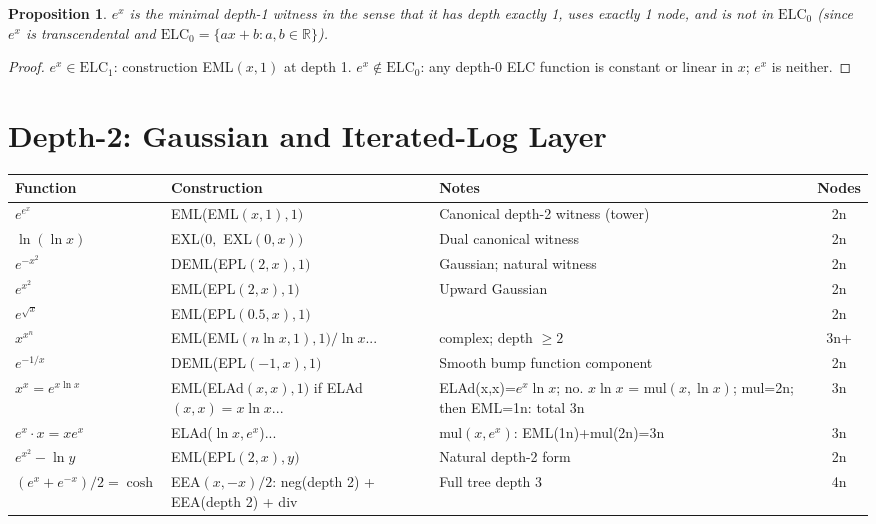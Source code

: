\documentclass[11pt]{article}
\newtheorem{proposition}[theorem]{Proposition}
\begin{document}
\begin{proposition}
$e^x$ is the minimal depth-1 witness in the sense that it has depth exactly 1,
uses exactly 1 node, and is not in $\mathrm{ELC}_0$ (since $e^x$ is transcendental
and $\mathrm{ELC}_0 = \{ax+b : a,b \in \mathbb{R}\}$).
\end{proposition}

\begin{proof}
$e^x \in \mathrm{ELC}_1$: construction EML$(x,1)$ at depth 1.
$e^x \notin \mathrm{ELC}_0$: any depth-0 ELC function is constant or linear in $x$;
$e^x$ is neither.
\end{proof}

\section{Depth-2: Gaussian and Iterated-Log Layer}
\label{sec:depth2}

\begin{center}
\begin{longtable}{lllc}
\toprule
Function & Construction & Notes & Nodes \\
\midrule
$e^{e^x}$ & EML(EML$(x,1),1)$ & Canonical depth-2 witness (tower) & 2n \\
$\ln(\ln x)$ & EXL$(0,$ EXL$(0,x))$ & Dual canonical witness & 2n \\
$e^{-x^2}$ & DEML(EPL$(2,x),1)$ & Gaussian; natural witness & 2n \\
$e^{x^2}$ & EML(EPL$(2,x),1)$ & Upward Gaussian & 2n \\
$e^{\sqrt{x}}$ & EML(EPL$(0.5,x),1)$ & & 2n \\
$x^{x^n}$ & EML(EML$(n\ln x,1), 1)/\ln x$... & complex; depth $\geq 2$ & 3n+ \\
$e^{-1/x}$ & DEML(EPL$(-1,x),1)$ & Smooth bump function component & 2n \\
$x^x = e^{x\ln x}$ & EML(ELAd$(x,x),1)$ if ELAd$(x,x) = x\ln x$... & ELAd(x,x)=$e^x \ln x$; no. $x\ln x$ = mul$(x,\ln x)$; mul=2n; then EML=1n: total 3n & 3n \\
$e^x \cdot x = xe^x$ & ELAd($\ln x, e^x$)... & mul$(x,e^x)$: EML(1n)+mul(2n)=3n & 3n \\
$e^{x^2} - \ln y$ & EML(EPL$(2,x),y)$ & Natural depth-2 form & 2n \\
$(e^x + e^{-x})/2 = \cosh$ & EEA$(x,-x)/2$: neg(depth 2) + EEA(depth 2) + div & Full tree depth 3 & 4n \\
\bottomrule
\end{longtable}
\end{center}
\end{document}
